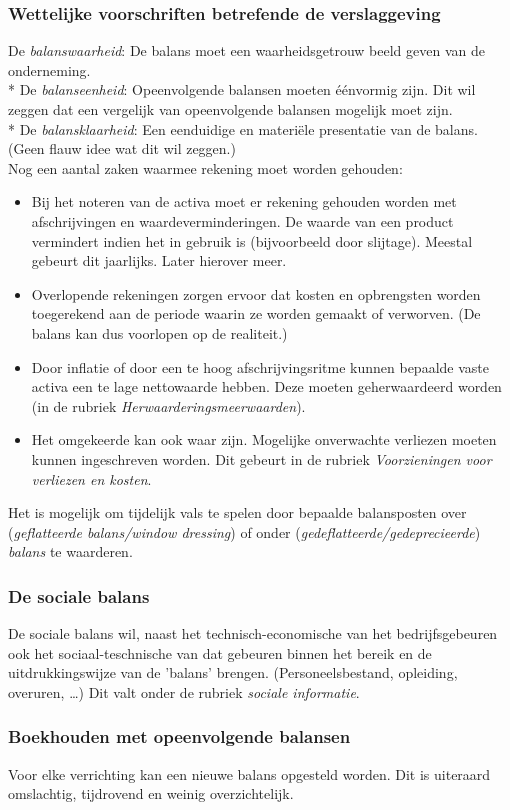 \documentclass[12pt]{article}
\begin{document}
\subsubsection{Wettelijke voorschriften betrefende de verslaggeving}
De \textit{balanswaarheid}: De balans moet een waarheidsgetrouw beeld geven van de onderneming.\\*
De \textit{balanseenheid}: Opeenvolgende balansen moeten \'e\'envormig zijn. Dit wil zeggen dat een vergelijk van opeenvolgende balansen mogelijk moet zijn.\\*
De \textit{balansklaarheid}: Een eenduidige en materi\"ele presentatie van de balans. (Geen flauw idee wat dit wil zeggen.)\\
Nog een aantal zaken waarmee rekening moet worden gehouden:
\begin{itemize}
\item Bij het noteren van de activa moet er rekening gehouden worden met afschrijvingen en waardeverminderingen. De waarde van een product vermindert indien het in gebruik is (bijvoorbeeld door slijtage). Meestal gebeurt dit jaarlijks. Later hierover meer.
\item Overlopende rekeningen zorgen ervoor dat kosten en opbrengsten worden toegerekend aan de periode waarin ze worden gemaakt of verworven. (De balans kan dus voorlopen op de realiteit.)
\item Door inflatie of door een te hoog afschrijvingsritme kunnen bepaalde vaste activa een te lage nettowaarde hebben. Deze moeten geherwaardeerd worden (in de rubriek \textit{Herwaarderingsmeerwaarden}).
\item Het omgekeerde kan ook waar zijn. Mogelijke onverwachte verliezen moeten kunnen ingeschreven worden. Dit gebeurt in de rubriek \textit{Voorzieningen voor verliezen en kosten}.
\end{itemize}
Het is mogelijk om tijdelijk vals te spelen door bepaalde balansposten over (\textit{geflatteerde balans/window dressing}) of onder (\textit{gedeflatteerde/gedeprecieerde}) \textit{balans} te waarderen.
\subsubsection{De sociale balans}
De sociale balans wil, naast het technisch-economische van het bedrijfsgebeuren ook het sociaal-teschnische van dat gebeuren binnen het bereik en de uitdrukkingswijze van de 'balans' brengen. (Personeelsbestand, opleiding, overuren, \dots) Dit valt onder de rubriek \textit{sociale informatie}.
\subsubsection{Boekhouden met opeenvolgende balansen}
Voor elke verrichting kan een nieuwe balans opgesteld worden. Dit is uiteraard omslachtig, tijdrovend en weinig overzichtelijk.
\end{document}
